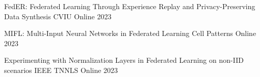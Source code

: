 \begin{cvhonors}

  \cvhonor
    {FedER: Federated Learning Through Experience Replay and Privacy-Preserving Data Synthesis} %
    {CVIU} %
    {Online} %
    {2023} %

  \cvhonor
    {MIFL: Multi-Input Neural Networks in Federated Learning} %
    {Cell Patterns} %
    {Online} %
    {2023} %

  \cvhonor
    {Experimenting with Normalization Layers in Federated Learning on non-IID scenarios} %
    {IEEE TNNLS} %
    {Online} %
    {2023} %

\end{cvhonors}


